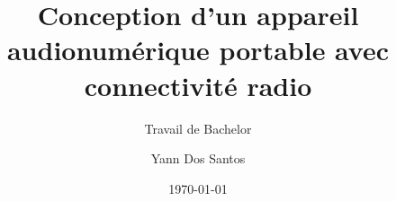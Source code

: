 \author{Yann Dos Santos}

\setmale

\title{Conception d'un appareil audionumérique portable avec connectivité radio}

\subtitle{Travail de Bachelor}


\date{\today}

